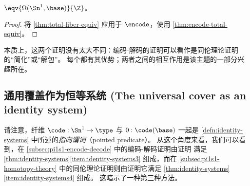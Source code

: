 \begin{thm}
  $\eqv {\Omega(\Sn^1,\base)} {\Z}$。
\end{thm}
\begin{proof}
  将 \cref{thm:total-fiber-equiv} 应用于 $\encode$，使用 \cref{thm:encode-total-equiv}。
\end{proof}

本质上，这两个证明没有太大不同：编码-解码的证明可以看作是同伦理论证明的“简化”或“解包”。
每个都有其优势；两者之间的相互作用是该主题的一部分兴趣所在。

\subsection{通用覆盖作为恒等系统 (The universal cover as an identity system)}
\label{sec:pi1s1-idsys}

请注意，纤维 $\code:\Sn^1\to\type$ 与 $0:\code(\base)$ 一起是 \cref{defn:identity-systems} 中所述的\emph{指向谓词}（pointed predicate）。
从这个角度来看，我们可以看到，在 \cref{subsec:pi1s1-encode-decode} 中的编码-解码证明由证明 \code 满足 \cref{thm:identity-systems}\ref{item:identity-systems3} 组成，而在 \cref{subsec:pi1s1-homotopy-theory} 中的同伦理论证明则由证明它满足 \cref{thm:identity-systems}\ref{item:identity-systems4} 组成。
这暗示了一种第三种方法。

